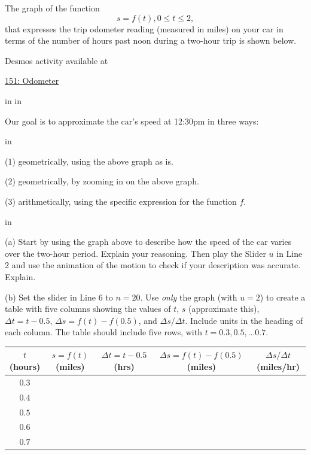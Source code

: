 \documentclass{ximera}
\newcommand{\pskip}{\vskip 0.1 in}
\begin{document}
\begin{example} \label{Ex:lkdftr45}
The graph of the function
\[
    s = f(t) , 0\leq t \leq 2 ,
\]
that expresses the trip odometer reading (measured in miles) on your car in terms of the number of hours past noon during a two-hour trip is shown below.

 
\begin{onlineOnly}
    \begin{center}
\end{center}
\end{onlineOnly}

Desmos activity available at

\href{https://www.desmos.com/calculator/iiw69lr1bc}{151: Odometer}

\pskip \pskip

Our goal is to approximate the car's speed at 12:30pm in three ways:

\pskip

(1) geometrically, using the above graph as is.

(2) geometrically, by zooming in on the above graph.

(3) arithmetically, using the specific expression for the function $f$.


\pskip

(a) Start by using the graph above to describe how the speed of the car varies over the two-hour period. Explain your reasoning. Then play the Slider $u$ in Line 2 and use the animation of the motion to check if your description was accurate. Explain.

(b) Set the slider in Line 6 to $n=20$. Use \emph{only} the graph (with $u=2$) to create a table with five columns showing the values of $t$, $s$ (approximate this), $\Delta t = t-0.5$, $\Delta s=f(t)-f(0.5)$, and $\Delta s / \Delta t$. Include units in the heading of each column. The table should include five rows, with $t= 0.3, 0.5, \ldots 0.7$. 

\begin{center}
  \begin{tabular}{ | c| c | c | c | c |}
    \hline
    $t$ (hours) & $s = f(t)$ (miles) & $\Delta t = t-0.5$ (hrs)  & $\Delta s = f(t) - f(0.5)$ (miles) & $\Delta s/\Delta t$ (miles/hr)  \\ \hline
    $0.3$ &  &  &   &  \\ \hline
    $0.4$ &  &  &   &  \\ \hline
    $0.5$  &   &  &  &   \\ \hline
    $0.6$ &  & &   &  \\ \hline
    $0.7$ &  &  &   &  \\ \hline
    \hline
  \end{tabular}
\end{center}


\end{example}
\end{document}
